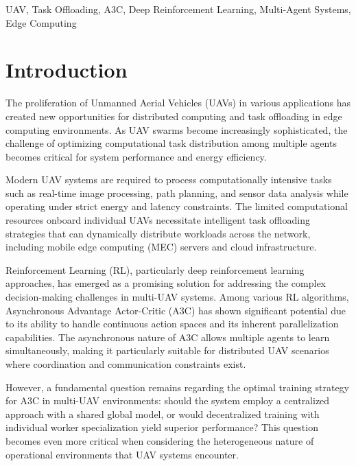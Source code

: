 \documentclass[journal]{IEEEtran}
\begin{document}
\begin{IEEEkeywords}
UAV, Task Offloading, A3C, Deep Reinforcement Learning, Multi-Agent Systems, Edge Computing
\end{IEEEkeywords}


\IEEEpeerreviewmaketitle

\section{Introduction}
\label{sec:introduction}

The proliferation of Unmanned Aerial Vehicles (UAVs) in various applications has created new opportunities for distributed computing and task offloading in edge computing environments. As UAV swarms become increasingly sophisticated, the challenge of optimizing computational task distribution among multiple agents becomes critical for system performance and energy efficiency.

Modern UAV systems are required to process computationally intensive tasks such as real-time image processing, path planning, and sensor data analysis while operating under strict energy and latency constraints. The limited computational resources onboard individual UAVs necessitate intelligent task offloading strategies that can dynamically distribute workloads across the network, including mobile edge computing (MEC) servers and cloud infrastructure.

Reinforcement Learning (RL), particularly deep reinforcement learning approaches, has emerged as a promising solution for addressing the complex decision-making challenges in multi-UAV systems. Among various RL algorithms, Asynchronous Advantage Actor-Critic (A3C) has shown significant potential due to its ability to handle continuous action spaces and its inherent parallelization capabilities. The asynchronous nature of A3C allows multiple agents to learn simultaneously, making it particularly suitable for distributed UAV scenarios where coordination and communication constraints exist.

However, a fundamental question remains regarding the optimal training strategy for A3C in multi-UAV environments: should the system employ a centralized approach with a shared global model, or would decentralized training with individual worker specialization yield superior performance? This question becomes even more critical when considering the heterogeneous nature of operational environments that UAV systems encounter.
\end{document}
